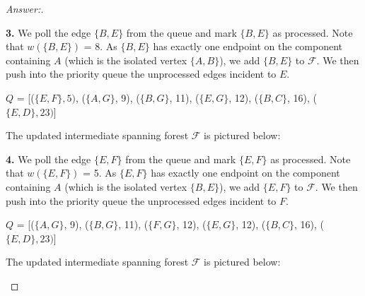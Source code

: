 \documentclass[11pt]{article}
\theoremstyle{definition}
\theoremstyle{definition}
\theoremstyle{definition}
\begin{document}
\begin{proof}[Answer:]
\begin{center}
\end{center}

\item \textbf{3.} We poll the edge $\{B, E\}$ from the queue and mark $\{B, E\}$ as processed. Note that $w(\{B, E\})$ = 8. As $\{B, E\}$ has exactly one endpoint on the component containing $A$ (which is the isolated vertex $\{A, B\}$), we add $\{B, E\}$ to $\mathcal{F}$. We then push into the priority queue the unprocessed edges incident to $E$.
\begin{center}
\item $Q$ = [($\{E, F\}, 5)$, ($\{A, G\}$, 9), ($\{B, G\}$, 11), ($\{E, G\}$, 12), ($\{B, C\}$, 16), ($\{E, D\}, 23)$]
\item The updated intermediate spanning forest $\mathcal{F}$ is pictured below: \\

\end{center}

\item \textbf{4.} We poll the edge $\{E, F\}$ from the queue and mark $\{E, F\}$ as processed. Note that $w(\{E, F\})$ = 5. As $\{E, F\}$ has exactly one endpoint on the component containing $A$ (which is the isolated vertex $\{B, E\}$), we add $\{E, F\}$ to $\mathcal{F}$. We then push into the priority queue the unprocessed edges incident to $F$.
\begin{center}
\item $Q$ = [($\{A, G\}$, 9), ($\{B, G\}$, 11), ($\{F, G\}$, 12), ($\{E, G\}$, 12), ($\{B, C\}$, 16), ($\{E, D\}, 23)$]
\item The updated intermediate spanning forest $\mathcal{F}$ is pictured below: \\


\end{center}
\end{proof}
\end{document}
